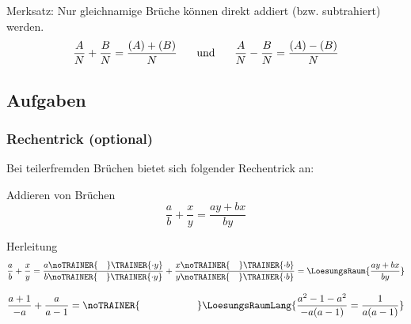 \begin{gesetz}{}{}
Merksatz: Nur gleichnamige Brüche können direkt addiert (bzw. subtrahiert)
werden.
$$\frac{A}{N} + \frac{B}{N} = \frac{(A)+(B)}{N} \hspace{5mm} \text{
und } \hspace{5mm} \frac{A}{N} - \frac{B}{N} = \frac{(A)-(B)}{N} $$
\end{gesetz}



\subsection*{Aufgaben}





\newpage

\subsubsection{Rechentrick (optional)}
Bei teilerfremden Brüchen bietet sich folgender Rechentrick an:

\begin{gesetz}{Addieren von Brüchen}{}
$$\frac{a}{b} + \frac{x}{y} = \frac{ay + bx}{by}$$
\end{gesetz}

\newcommand{\miniPlatz}[1]{\noTRAINER{\,\,\,\,\,\,}\TRAINER{#1}}

Herleitung
$$\frac{a}{b} + \frac{x}{y} = %
\frac{a\miniPlatz{\cdot{}y}}{b\miniPlatz{\cdot{}y}} + \frac{x\miniPlatz{\cdot{}b}}{y\miniPlatz{\cdot{}b}} = \LoesungsRaum{\frac{ay + bx}{by}}$$


\begin{beispiel}{}{}
$$\frac{a+1}{-a} + \frac{a}{a-1} = \noTRAINER{\hspace{2cm}}\LoesungsRaumLang{ \frac{a^2 - 1 - a^2}{-a(a-1)} = \frac{1}{a(a-1)}}$$
\end{beispiel}

